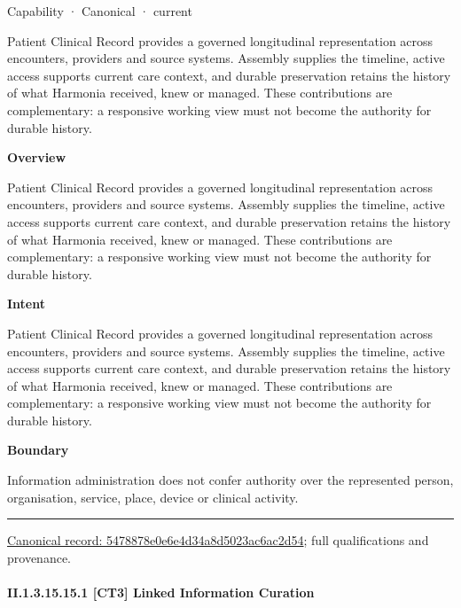 \label{element:5478878e0e6e4d34a8d5023ac6ac2d54}
{\small Capability · Canonical · current}\par

Patient Clinical Record provides a governed longitudinal representation across encounters, providers and source systems. Assembly supplies the timeline, active access supports current care context, and durable preservation retains the history of what Harmonia received, knew or managed. These contributions are complementary: a responsive working view must not become the authority for durable history.



\textbf{Overview}



Patient Clinical Record provides a governed longitudinal representation across encounters, providers and source systems. Assembly supplies the timeline, active access supports current care context, and durable preservation retains the history of what Harmonia received, knew or managed. These contributions are complementary: a responsive working view must not become the authority for durable history.



\textbf{Intent}



Patient Clinical Record provides a governed longitudinal representation across encounters, providers and source systems. Assembly supplies the timeline, active access supports current care context, and durable preservation retains the history of what Harmonia received, knew or managed. These contributions are complementary: a responsive working view must not become the authority for durable history.



\textbf{Boundary}



Information administration does not confer authority over the represented person, organisation, service, place, device or clinical activity.



\medskip\hrule\medskip

{\footnotesize \href{../../../../continuum/strategy/capability/5478878e0e6e4d34a8d5023ac6ac2d54.md}{Canonical record: 5478878e0e6e4d34a8d5023ac6ac2d54}; full qualifications and provenance.}\par
\paragraph*{II.1.3.15.15.1 [CT3] Linked Information Curation}
\label{navigation:II.1.3.15.15.1}

